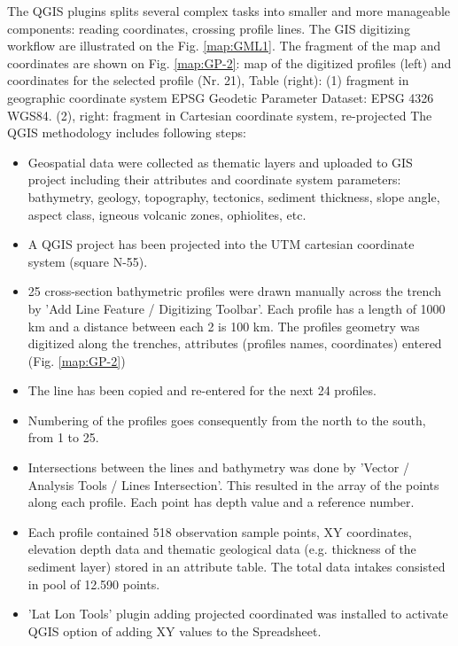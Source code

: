 \documentclass[11pt,a4paper]{report}
\begin{document}
{The \ac{QGIS} plugins splits several complex tasks into smaller and more manageable components: reading coordinates, crossing profile lines. The \ac{GIS} digitizing workflow are illustrated on the Fig. \ref{map:GML1}. The fragment of the map and coordinates are shown on Fig. \ref{map:GP-2}: map of the digitized profiles (left) and coordinates for the selected profile (Nr. 21), Table (right): (1) fragment in geographic coordinate system \ac{EPSG} Geodetic Parameter Dataset: \ac{EPSG} 4326 \ac{WGS84}. (2), right: fragment in Cartesian coordinate system, re-projected The \ac{QGIS} methodology includes following steps:

\begin{itemize}
	\item Geospatial data were collected as thematic layers and uploaded to \ac{GIS} project including their attributes and coordinate system parameters: bathymetry, geology, topography, tectonics, sediment thickness, slope angle, aspect class, igneous volcanic zones, ophiolites, etc.  
	\item A \ac{QGIS} project has been projected into the \ac{UTM} cartesian coordinate system (square N-55). 
	\item 25 cross-section bathymetric profiles were drawn manually across the trench by 'Add Line Feature / Digitizing Toolbar'. Each profile has a length of 1000 km and a distance between each 2 is 100 km. The profiles geometry was digitized along the trenches, attributes (profiles names, coordinates) entered (Fig. \ref{map:GP-2})
	\item The line has been copied and re-entered for the next 24 profiles.
	\item Numbering of the profiles goes consequently from the north to the south, from 1 to 25. 
	\item Intersections between the lines and bathymetry was done by 'Vector / Analysis Tools / Lines Intersection'. This resulted in the array of the points along each profile. Each point has depth value and a reference number. 
	\item Each profile contained 518 observation sample points, XY coordinates, elevation depth data and thematic geological data (e.g. thickness of the sediment layer) stored in an attribute table. The total data intakes consisted in pool of 12.590 points.
	\item 'Lat Lon Tools' plugin adding projected coordinated was installed to activate \ac{QGIS} option of adding XY values to the Spreadsheet. 

\end{itemize}}
\end{document}
